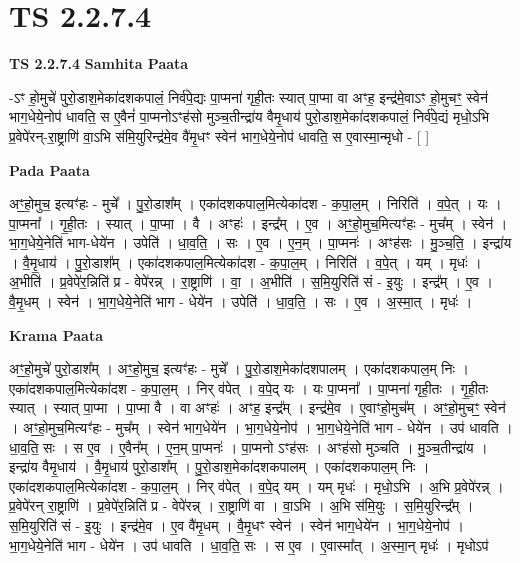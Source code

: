 \documentclass[17pt]{extarticle}
\begin{document}
\section{ TS 2.2.7.4 }

\textbf{TS 2.2.7.4 } \newline
\textbf{Samhita Paata} \newline

-ऽꣳ हो॒मुचे॑ पुरो॒डाश॒मेका॑दशकपालं॒ निर्व॑पे॒द्यः पा॒प्मना॑ गृही॒तः स्यात् पा॒प्मा वा अꣳह॒ इन्द्र॑मे॒वाऽꣳ हो॒मुचꣳ॒॒ स्वेन॑ भाग॒धेये॒नोप॑ धावति॒ स ए॒वैनं॑ पा॒प्मनोऽꣳह॑सो मुञ्च॒तीन्द्रा॑य वैमृ॒धाय॑ पुरो॒डाश॒मेका॑दशकपालं॒ निर्व॑पे॒द्यं मृधो॒ऽभि प्र॒वेपे॑रन्-रा॒ष्ट्राणि॑ वा॒ऽभि स॑मि॒युरिन्द्र॑मे॒व वै॑मृ॒धꣳ स्वेन॑ भाग॒धेये॒नोप॑ धावति॒ स ए॒वास्मा॒न्मृधो - [  ] \newline

\textbf{Pada Paata} \newline

अꣳ॒॒हो॒मुच॒ इत्यꣳ॑हः - मुचे᳚ । पु॒रो॒डाश᳚म् । एका॑दशकपाल॒मित्येका॑दश - क॒पा॒ल॒म् । निरिति॑ । व॒पे॒त् । यः । पा॒प्मना᳚ । गृ॒ही॒तः । स्यात् । पा॒प्मा । वै । अꣳहः॑ । इन्द्र᳚म् । ए॒व । अꣳ॒॒हो॒मुच॒मित्यꣳ॑हः - मुच᳚म् । स्वेन॑ । भा॒ग॒धेये॒नेति॑ भाग-धेये॑न । उपेति॑ । धा॒व॒ति॒ । सः । ए॒व । ए॒न॒म् । पा॒प्मनः॑ । अꣳह॑सः । मु॒ञ्च॒ति॒ । इन्द्रा॑य । वै॒मृ॒धाय॑ । पु॒रो॒डाश᳚म् । एका॑दशकपाल॒मित्येका॑दश - क॒पा॒ल॒म् । निरिति॑ । व॒पे॒त् । यम् । मृधः॑ । अ॒भीति॑ । प्र॒वेपे॑र॒न्निति॑ प्र - वेपे॑रन्न् । रा॒ष्ट्राणि॑ । वा॒ । अ॒भीति॑ । स॒मि॒युरिति॑ सं - इ॒युः । इन्द्र᳚म् । ए॒व । वै॒मृ॒धम् । स्वेन॑ । भा॒ग॒धेये॒नेति॑ भाग - धेये॑न । उपेति॑ । धा॒व॒ति॒ । सः । ए॒व । अ॒स्मा॒त् । मृधः॑ ।  \newline


\textbf{Krama Paata} \newline

अꣳ॒॒हो॒मुचे॑ पुरो॒डाश᳚म् । अꣳ॒॒हो॒मुच॒ इत्यꣳ॑हः - मुचे᳚ । पु॒रो॒डाश॒मेका॑दशपालम् । एका॑दशकपाल॒म् निः । एका॑दशकपाल॒मित्येका॑दश - क॒पा॒ल॒म् । निर् व॑पेत् । व॒पे॒द् यः । यः पा॒प्मना᳚ । पा॒प्मना॑ गृही॒तः । गृ॒ही॒तः स्यात् । स्यात् पा॒प्मा । पा॒प्मा वै । वा अꣳहः॑ । अꣳह॒ इन्द्र᳚म् । इन्द्र॑मे॒व । ए॒वाꣳहो॒मुच᳚म् । अꣳ॒॒हो॒मुचꣳ॒॒ स्वेन॑ । अꣳ॒॒हो॒मुच॒मित्यꣳ॑हः - मुच᳚म् । स्वेन॑ भाग॒धेये॑न । भा॒ग॒धेये॒नोप॑ । भा॒ग॒धेये॒नेति॑ भाग - धेये॑न । उप॑ धावति । धा॒व॒ति॒ सः । स ए॒व । ए॒वैन᳚म् । ए॒न॒म् पा॒प्मनः॑ । पा॒प्मनो ऽꣳह॑सः । अꣳह॑सो मुञ्चति । मु॒ञ्च॒तीन्द्रा॑य । इन्द्रा॑य वैमृ॒धाय॑ । वै॒मृ॒धाय॑ पुरो॒डाश᳚म् । पु॒रो॒डाश॒मेका॑दशकपालम् । एका॑दशकपाल॒म् निः । एका॑दशकपाल॒मित्येका॑दश - क॒पा॒ल॒म् । निर् व॑पेत् । व॒पे॒द् यम् । यम् मृधः॑ । मृधो॒ऽभि । अ॒भि प्र॒वेपे॑रन्न् । प्र॒वेपे॑रन् रा॒ष्ट्राणि॑ । प्र॒वेपे॑र॒न्निति॑ प्र - वेपे॑रन्न् । रा॒ष्ट्राणि॑ वा । वा॒ऽभि । अ॒भि स॑मि॒युः । स॒मि॒युरिन्द्र᳚म् । स॒मि॒युरिति॑ सं - इ॒युः । इन्द्र॑मे॒व । ए॒व वै॑मृ॒धम् । वै॒मृ॒धꣳ स्वेन॑ । स्वेन॑ भाग॒धेये॑न । भा॒ग॒धेये॒नोप॑ । भा॒ग॒धेये॒नेति॑ भाग - धेये॑न । उप॑ धावति । धा॒व॒ति॒ सः । स ए॒व । ए॒वास्मा᳚त् । अ॒स्मा॒न् मृधः॑ । मृधोऽप॑ \newline
\end{document}
